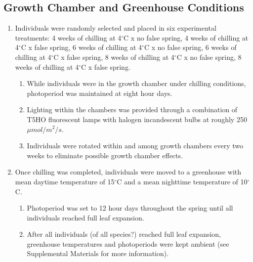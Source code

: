 \documentclass{article}\usepackage[]{graphicx}\usepackage[]{color}
\begin{document}
\subsection*{Growth Chamber and Greenhouse Conditions}
\begin{enumerate}
\item Individuals were randomly selected and placed in six experimental treatments: 4 weeks of chilling at 4$^{\circ}$C x no false spring, 4 weeks of chilling at 4$^{\circ}$C x false spring, 6 weeks of chilling at 4$^{\circ}$C x no false spring, 6 weeks of chilling at 4$^{\circ}$C x false spring,
8 weeks of chilling at 4$^{\circ}$C x no false spring, 8 weeks of chilling at 4$^{\circ}$C x false spring.
  \begin{enumerate}
  \item While individuals were in the growth chamber under chilling conditions, photoperiod was maintained at eight hour days.
  \item Lighting within the chambers was provided through a combination of T5HO fluorescent lamps with halogen incandescent bulbs at roughly 250 $\mu mol/m^{2}/s$.
  \item Individuals were rotated within and among growth chambers every two weeks to eliminate possible growth chamber effects.
  \end{enumerate}
\item Once chilling was completed, individuals were moved to a greenhouse with mean daytime temperature of 15$^{\circ}$C and a mean nighttime temperature of 10$^{\circ}$C.
  \begin{enumerate}
  \item Photoperiod was set to 12 hour days throughout the spring until all individuals reached full leaf expansion.
  \item After all individuals (of all species?) reached full leaf expansion, greenhouse temperatures and photoperiods were kept ambient (see Supplemental Materials for more information). 
  \end{enumerate}
\end{enumerate}
\end{document}
